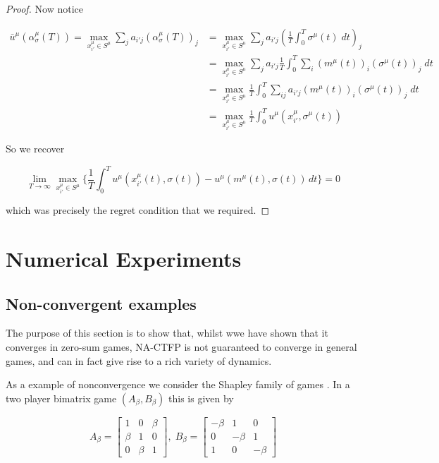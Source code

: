 \documentclass{article}
\theoremstyle{definition}
\begin{document}
\begin{proof}
    Now notice

    \begin{align}
      \bar{u}^\mu (\alpha_\sigma^\mu (T)) = \max_{x^\mu_{i'} \in S^\mu} \sum_{j} a_{i'j} (\alpha_{\sigma}^\mu (T))_j & = \max_{x^\mu_{i'} \in S^\mu} \sum_{j} a_{i'j} (\frac{1}{T} \int_{0}^{T} \sigma^\mu(t) \; dt)_j \\
      & = \max_{x^\mu_{i'} \in S^\mu} \sum_{j} a_{i'j} \frac{1}{T} \int_{0}^{T} \sum_i (m^\mu (t))_i (\sigma^\mu(t))_j \; dt\\
      & = \max_{x^\mu_{i'} \in S^\mu} \frac{1}{T} \int_0^T \sum_{ij} a_{i'j} (m^\mu (t))_i (\sigma^\mu(t))_j \; dt\\
      & = \max_{x^\mu_{i'} \in S^\mu} \frac{1}{T} \int_0^T u^\mu(x^\mu_{i'}, \sigma^\mu(t))
    \end{align}

    So we recover

    \begin{equation}
      \lim_{T \rightarrow \infty} \max_{x_{i'}^\mu \in S^\mu} \Big\{ \frac{1}{T} \int_{0}^{T} u^{\mu}(x_{i'}^\mu(t), \sigma(t)) - u^{\mu}(m^\mu(t), \sigma(t)) \, dt \Big\} = 0
    \end{equation}

    which was precisely the regret condition that we required.

  \end{proof}

\section{Numerical Experiments}

  \subsection{Non-convergent examples} \label{sec::NonConv}
  The purpose of this section is to show that, whilst wwe have shown that it converges in zero-sum games, NA-CTFP is not guaranteed to converge in general games, and can in fact give rise to a rich variety of dynamics.

  
  
  As a example of nonconvergence we consider the Shapley family of games \cite{}. In a two player bimatrix game $(A_\beta, B_\beta)$ this is given by

  \begin{equation}
    A_\beta = \begin{bmatrix}
      1 & 0 & \beta \\
      \beta & 1 & 0 \\
      0 & \beta & 1
    \end{bmatrix}, \; B_\beta =  \begin{bmatrix}
      - \beta & 1 & 0 \\
      0 & -\beta & 1 \\
      1 & 0 & -\beta
    \end{bmatrix}
  \end{equation}
\end{document}
